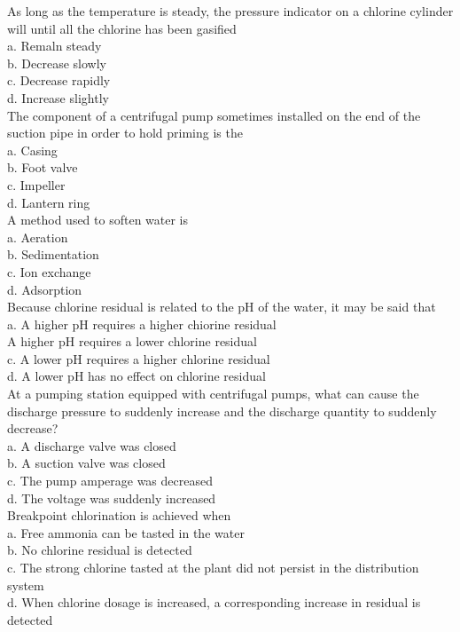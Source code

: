 As long as the temperature is steady, the pressure indicator on a chlorine cylinder will until all the chlorine has been gasified\\
a. Remaln steady\\
b. Decrease slowly\\
c. Decrease rapidly\\
d. Increase slightly\\

The component of a centrifugal pump sometimes installed on the end of the suction pipe in order to hold priming is the\\
a. Casing\\
b. Foot valve\\
c. Impeller\\
d. Lantern ring\\

A method used to soften water is\\
a. Aeration\\
b. Sedimentation\\
c. Ion exchange\\
d. Adsorption\\

Because chlorine residual is related to the $\mathrm{pH}$ of the water, it may be said that\\
a. A higher $\mathrm{pH}$ requires a higher chiorine residual\\

A higher $\mathrm{pH}$ requires a lower chlorine residual\\
c. A lower pH requires a higher chlorine residual\\
d. A lower $\mathrm{pH}$ has no effect on chlorine residual\\

At a pumping station equipped with centrifugal pumps, what can cause the discharge pressure to suddenly increase and the discharge quantity to suddenly decrease?\\
a.  A discharge valve was closed\\
b. A suction valve was closed\\
c. The pump amperage was decreased\\
d. The voltage was suddenly increased\\

Breakpoint chlorination is achieved when\\
a. Free ammonia can be tasted in the water\\
b. No chlorine residual is detected\\
c. The strong chlorine tasted at the plant did not persist in the distribution system\\
d. When chlorine dosage is increased, a corresponding increase in residual is detected\\

